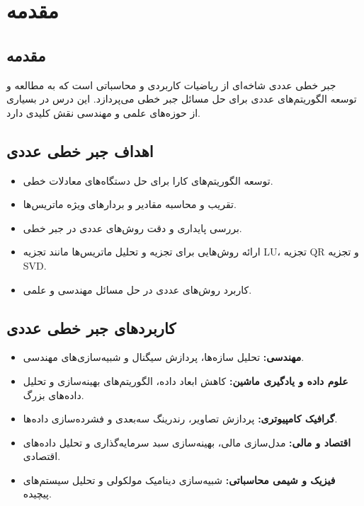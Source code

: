 \chapter*{مقدمه}
\section{مقدمه}
جبر خطی عددی شاخه‌ای از ریاضیات کاربردی و محاسباتی است که به مطالعه و توسعه الگوریتم‌های عددی برای حل مسائل جبر خطی می‌پردازد. این درس در بسیاری از حوزه‌های علمی و مهندسی نقش کلیدی دارد.

\section{اهداف جبر خطی عددی}


\begin{itemize}
	\item توسعه الگوریتم‌های کارا برای حل دستگاه‌های معادلات خطی.
	\item تقریب و محاسبه مقادیر و بردارهای ویژه ماتریس‌ها.
	\item بررسی پایداری و دقت روش‌های عددی در جبر خطی.
	\item ارائه روش‌هایی برای تجزیه و تحلیل ماتریس‌ها مانند تجزیه LU، تجزیه QR و تجزیه SVD.
	\item کاربرد روش‌های عددی در حل مسائل مهندسی و علمی.
\end{itemize}

\section{کاربردهای جبر خطی عددی}
\begin{itemize}
	\item \textbf{مهندسی:} تحلیل سازه‌ها، پردازش سیگنال و شبیه‌سازی‌های مهندسی.
	\item \textbf{علوم داده و یادگیری ماشین:} کاهش ابعاد داده، الگوریتم‌های بهینه‌سازی و تحلیل داده‌های بزرگ.
	\item \textbf{گرافیک کامپیوتری:} پردازش تصاویر، رندرینگ سه‌بعدی و فشرده‌سازی داده‌ها.
	\item \textbf{اقتصاد و مالی:} مدل‌سازی مالی، بهینه‌سازی سبد سرمایه‌گذاری و تحلیل داده‌های اقتصادی.
	\item \textbf{فیزیک و شیمی محاسباتی:} شبیه‌سازی دینامیک مولکولی و تحلیل سیستم‌های پیچیده.
\end{itemize}

